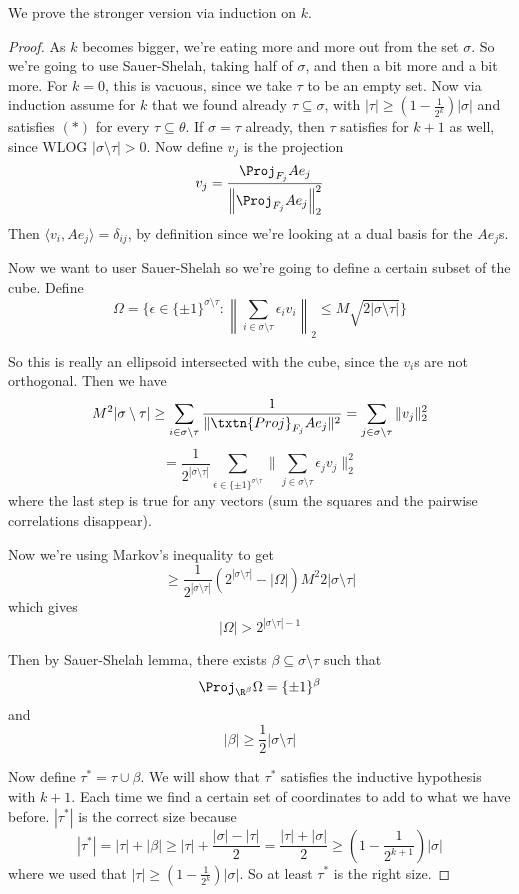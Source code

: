 We prove the stronger version via induction on $k$. 
\begin{proof}
As $k$ becomes bigger, we're eating more and more out from the set $\sigma$. So we're going to use Sauer-Shelah, taking half of $\sigma$, and then a bit more and a bit more. 
For $k = 0$, this is vacuous, since we take $\tau$ to be an empty set. Now via induction assume for $k$ that we found already $\tau \subseteq \sigma$, with $|\tau| \geq (1 - \frac{1}{2^k})|\sigma|$ and satisfies $(*)$ for every $\tau \subseteq \theta$. If $\sigma = \tau$ already, then $\tau$ satisfies for $k + 1$ as well, since WLOG $|\sigma \setminus \tau| > 0$. Now define $v_j$ is the projection 
\[
v_j = \frac{\Proj_{F_j} Ae_j}{\left\|\Proj_{F_j} Ae_j\right\|_2^2}
\]
Then $\langle v_i, Ae_j \rangle = \delta_{ij}$, by definition since we're looking at a dual basis for the $Ae_j$s. 

Now we want to user Sauer-Shelah so we're going to define a certain subset of the cube. Define 
\[
\Omega = \{\epsilon \in \{\pm 1\}^{\sigma \setminus \tau}: \left\|\sum_{i \in \sigma \setminus \tau} \epsilon_i v_i \right\|_2 \leq M\sqrt{2|\sigma \setminus \tau|}\}\]

So this is really an ellipsoid intersected with the cube, since the $v_i$s are not orthogonal.  Then we have 
\[
M^2 |\sigma \setminus \tau| \geq \sum_{i \in \sigma \setminus \tau} \frac{1}{\|\txtn{Proj}_{F_j}Ae_j\|^2} = \sum_{j \in \sigma \setminus \tau} \|v_j\|_2^2
\]
\[
= \frac{1}{2^{|\sigma \setminus \tau|}} \sum_{\epsilon \in \{\pm 1\}^{\sigma \setminus \tau}} \| \sum_{j \in \sigma \setminus \tau} \epsilon_j v_j \|_2^2
\]
where the last step is true for any vectors (sum the squares and the pairwise correlations disappear). 

Now we're using Markov's inequality to get 
\[
\geq \frac{1}{2^{|\sigma \setminus \tau|}} \left(2^{|\sigma \setminus \tau|} - |\Omega| \right)M^2 2|\sigma \setminus \tau|
\]
which gives 
\[
|\Omega| > 2^{|\sigma \setminus \tau| - 1}
\]

Then by Sauer-Shelah lemma, there exists $\beta \subseteq \sigma \setminus \tau$ such that 
\[
\Proj_{\R^{\beta}} \Omega = \{\pm 1 \}^{\beta}
\]
and 
\[
|\beta| \geq \frac{1}{2}|\sigma \setminus \tau|
\]

Now define $\tau^* = \tau \cup \beta$. We will show that $\tau^*$ satisfies the inductive hypothesis with $k + 1$. Each time we find a certain set of coordinates to add to what we have before. $|\tau^*|$ is the correct size because 
\[
|\tau^*| = |\tau| + |\beta| \geq |\tau| + \frac{|\sigma| - |\tau|}{2} = \frac{|\tau| + |\sigma|}{2} \geq \left(1 - \frac{1}{2^{k + 1}}\right)|\sigma|
\]
where we used that $|\tau| \geq \left(1 - \frac{1}{2^{k}}\right)|\sigma|$. So at least $\tau^*$ is the right size. 


\end{proof}
